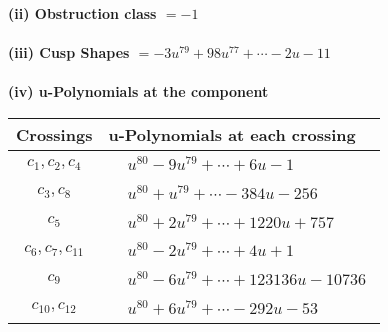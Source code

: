 \documentclass[1p]{elsarticle_modified}
\theoremstyle{definition}
\begin{document}
\flushleft \textbf{(ii) Obstruction class $= -1$}\\~\\
\flushleft \textbf{(iii) Cusp Shapes $= -3 u^{79}+98 u^{77}+\cdots-2 u-11$}\\~\\
\newpage\renewcommand{\arraystretch}{1}
\flushleft \textbf{(iv) u-Polynomials at the component}\newline \\
\begin{tabular}{m{50pt}|m{274pt}}
Crossings & \hspace{64pt}u-Polynomials at each crossing \\
\hline $$\begin{aligned}c_{1},c_{2},c_{4}\end{aligned}$$&$\begin{aligned}
&u^{80}-9 u^{79}+\cdots+6 u-1
\end{aligned}$\\
\hline $$\begin{aligned}c_{3},c_{8}\end{aligned}$$&$\begin{aligned}
&u^{80}+u^{79}+\cdots-384 u-256
\end{aligned}$\\
\hline $$\begin{aligned}c_{5}\end{aligned}$$&$\begin{aligned}
&u^{80}+2 u^{79}+\cdots+1220 u+757
\end{aligned}$\\
\hline $$\begin{aligned}c_{6},c_{7},c_{11}\end{aligned}$$&$\begin{aligned}
&u^{80}-2 u^{79}+\cdots+4 u+1
\end{aligned}$\\
\hline $$\begin{aligned}c_{9}\end{aligned}$$&$\begin{aligned}
&u^{80}-6 u^{79}+\cdots+123136 u-10736
\end{aligned}$\\
\hline $$\begin{aligned}c_{10},c_{12}\end{aligned}$$&$\begin{aligned}
&u^{80}+6 u^{79}+\cdots-292 u-53
\end{aligned}$\\
\hline
\end{tabular}\\~\\
\end{document}
